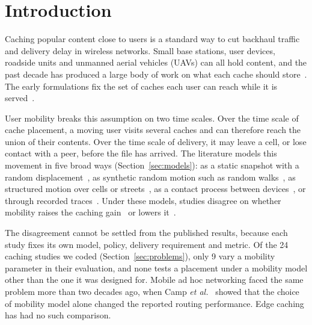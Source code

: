 
\section{Introduction}
\label{sec:intro}

Caching popular content close to users is a standard way to cut backhaul traffic and delivery delay in wireless networks. Small base stations, user devices, roadside units and unmanned aerial vehicles (UAVs) can all hold content, and the past decade has produced a large body of work on what each cache should store~\cite{shanmugam2013femtocaching,golrezaei2013femtocaching,maddahali2014fundamental,bastug2014living,paschos2018role}. The early formulations fix the set of caches each user can reach while it is served~\cite{shanmugam2013femtocaching,maddahali2014fundamental}.

User mobility breaks this assumption on two time scales. Over the time scale of cache placement, a moving user visits several caches and can therefore reach the union of their contents. Over the time scale of delivery, it may leave a cell, or lose contact with a peer, before the file has arrived. The literature models this movement in five broad ways (Section~\ref{sec:models}): as a static snapshot with a random displacement~\cite{krishnan2017mobility}, as synthetic random motion such as random walks~\cite{hosny2019performance}, as structured motion over cells or streets~\cite{poularakis2013exploiting,ozfatura2020mobility,alnagar2019city}, as a contact process between devices~\cite{wang2017mobility,wang2018exploiting}, or through recorded traces~\cite{chen2017sky,choi2023deep}. Under these models, studies disagree on whether mobility raises the caching gain~\cite{wang2018exploiting} or lowers it~\cite{jarray2016mobility}.

The disagreement cannot be settled from the published results, because each study fixes its own model, policy, delivery requirement and metric. Of the 24 caching studies we coded (Section~\ref{sec:problems}), only 9 vary a mobility parameter in their evaluation, and none tests a placement under a mobility model other than the one it was designed for. Mobile ad hoc networking faced the same problem more than two decades ago, when Camp \emph{et al.}~\cite{camp2002survey} showed that the choice of mobility model alone changed the reported routing performance. Edge caching has had no such comparison.

